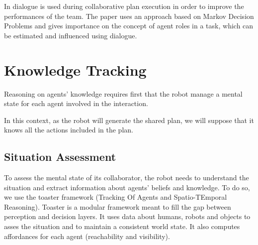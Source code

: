 \documentclass{llncs}
\begin{document}
In \cite{clairrobot} dialogue is used during collaborative plan execution in order to improve the performances of the team. The paper uses an approach based on Markov Decision Problems and gives importance on the concept of agent roles in a task, which can be estimated and influenced using dialogue. 

















\section{Knowledge Tracking}
Reasoning on agents' knowledge requires first that the robot manage a mental state for each agent involved in the interaction.

In this context, as the robot will generate the shared plan, we will suppose that it knows all the actions included in the plan.

\subsection{Situation Assessment}
To assess the mental state of its collaborator, the robot needs to understand the situation and extract information about agents' beliefs and knowledge.
To do so, we use the toaster framework (Tracking Of Agents and Spatio-TEmporal Reasoning). Toaster is a modular framework meant to fill the gap between perception and decision layers. It uses data about humans, robots and objects to asses the situation and to maintain a consistent world state. It also computes affordances for each agent (reachability and visibility).
\end{document}
